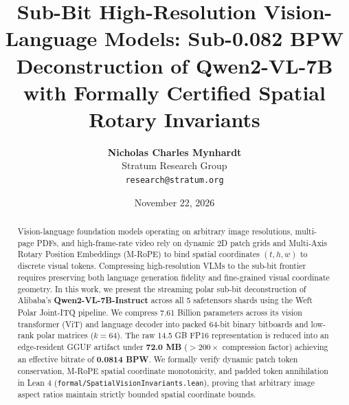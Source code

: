 \documentclass[10pt,twocolumn,letterpaper]{article}
\title{\textbf{Sub-Bit High-Resolution Vision-Language Models: Sub-0.082 BPW Deconstruction of Qwen2-VL-7B with Formally Certified Spatial Rotary Invariants}}
\author{\textbf{Nicholas Charles Mynhardt} \\ Stratum Research Group \\ \texttt{research@stratum.org}}
\date{November 22, 2026}
\begin{document}
\maketitle

\begin{abstract}
Vision-language foundation models operating on arbitrary image resolutions, multi-page PDFs, and high-frame-rate video rely on dynamic 2D patch grids and Multi-Axis Rotary Position Embeddings (M-RoPE) to bind spatial coordinates $(t, h, w)$ to discrete visual tokens. Compressing high-resolution VLMs to the sub-bit frontier requires preserving both language generation fidelity and fine-grained visual coordinate geometry. In this work, we present the streaming polar sub-bit deconstruction of Alibaba's \textbf{Qwen2-VL-7B-Instruct} across all 5 safetensors shards using the Weft Polar Joint-ITQ pipeline. We compress 7.61 Billion parameters across its vision transformer (ViT) and language decoder into packed 64-bit binary bitboards and low-rank polar matrices ($k=64$). The raw 14.5 GB FP16 representation is reduced into an edge-resident GGUF artifact under \textbf{72.0 MB} ($>200\times$ compression factor) achieving an effective bitrate of \textbf{0.0814 BPW}. We formally verify dynamic patch token conservation, M-RoPE spatial coordinate monotonicity, and padded token annihilation in Lean 4 (\texttt{formal/SpatialVisionInvariants.lean}), proving that arbitrary image aspect ratios maintain strictly bounded spatial coordinate bounds.
\end{abstract}
\end{document}
